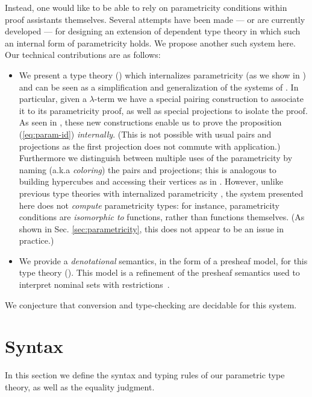 \documentclass[english]{PaperTools/latex/entcs}
\theoremstyle{plain}
\theoremstyle{definition}
\theoremstyle{remark}
\begin{document}
Instead, one would like to be able to rely on parametricity conditions
within proof assistants themselves.  Several attempts have been made
\citep{bernardy_computational_2012,bernardy_type-theory_2013} --- or are currently
developed \citep{altenkirch2014syntax} ---
for designing an extension of dependent type theory in which such an internal form of
parametricity holds. We propose another such system here.
Our technical contributions are as follows:
\begin{itemize}
\item We present a type theory () which internalizes parametricity (as we show in )
  and can be seen as a simplification and generalization of the systems of
  \citet{bernardy_computational_2012,bernardy_type-theory_2013}.
  In particular, given a $λ$-term we have a special pairing construction
  to associate it to its parametricity proof, as well as special
  projections to isolate the proof. As seen in , these
  new constructions enable us to prove the proposition (\ref{eq:param-id})
  \emph{internally}.  (This is not possible with usual pairs and
  projections as the first projection does not commute with
  application.)  Furthermore we distinguish between multiple uses of the
  parametricity by naming (a.k.a \emph{coloring}) the pairs and
  projections; this is analogous to building hypercubes and accessing
  their vertices as in \citep{bernardy_computational_2012}.
  However, unlike previous type theories with internalized parametricity
  \citep{bernardy_computational_2012, bernardy_type-theory_2013}, the
  system presented here does not \emph{compute} parametricity types:
  for instance, parametricity conditions are \emph{isomorphic to}
  functions, rather than functions themselves.  (As shown in
  Sec. \ref{sec:parametricity}, this does not appear to be an issue in
  practice.)
\item We provide a \emph{denotational} semantics, in the form of a presheaf model, for this type theory ().
      This model is a refinement of the presheaf semantics used to
      interpret nominal sets with
      restrictions~\citep{bezem2014model,DBLP:journals/corr/Pitts14}.
\end{itemize}
We conjecture that conversion and type-checking are decidable for this system.

\section{Syntax}
\label{sec:syntax}
In this section we define the syntax and typing rules of our
parametric type theory, as well as the equality judgment.
\end{document}
